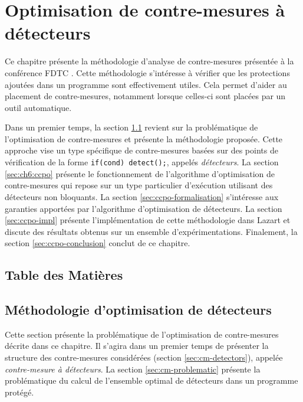 \chapter{Optimisation de contre-mesures à détecteurs}
\label{chpt:ccpo}

    Ce chapitre présente la méthodologie d'analyse de contre-mesures présentée à la conférence FDTC \cite{Boespflug/FDTC20}.
    Cette méthodologie s'intéresse à vérifier que les protections ajoutées dans un programme sont effectivement utiles. Cela permet d'aider au placement de contre-mesures, notamment lorsque celles-ci sont placées par un outil automatique.
    
    Dans un premier temps, la section \ref{sec:ccpo-metho} revient sur la problématique de l'optimisation de contre-mesures et présente la méthodologie proposée. 
    Cette approche vise un type spécifique de contre-mesures basées sur des points de vérification de la forme \texttt{if(cond) detect();}, appelés \textit{détecteurs}. 
    La section \ref{sec:ch6:ccpo} présente le fonctionnement de l'algorithme d'optimisation de contre-mesures qui repose sur un type particulier d'exécution utilisant des détecteurs non bloquants.
    La section \ref{sec:ccpo-formalisation} s'intéresse aux garanties apportées par l'algorithme d'optimisation de détecteurs.
    La section \ref{sec:ccpo-impl} présente l'implémentation de cette méthodologie dans Lazart et discute des résultats obtenus sur un ensemble d'expérimentations.
    Finalement, la section \ref{sec:ccpo-conclusion} conclut de ce chapitre.
   
    \section*{Table des Matières}
    \localtableofcontents
    
    \section{Méthodologie d'optimisation de détecteurs}
    \label{sec:ccpo-metho}
    
        Cette section présente la problématique de l'optimisation de contre-mesures décrite dans ce chapitre.
        Il s'agira dans un premier temps de présenter la structure des contre-mesures considérées (section \ref{sec:cm-detectors}), appelée \textit{contre-mesure à détecteurs}. 
        La section \ref{sec:cm-problematic} présente la problématique du calcul de l'ensemble optimal de détecteurs dans un programme protégé.        
        
